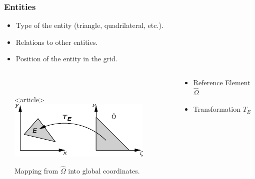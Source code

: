 \documentclass[ignorenonframetext,11pt]{beamer}
\theoremstyle{definition}
\begin{document}
\begin{frame}
  \frametitle{Entities}

  \begin{itemize}
  \item Type of the entity (triangle, quadrilateral, etc.).
  \item Relations to other entities.
  \end{itemize}
  \begin{itemize}
  \item Position of the entity in the grid.
  \end{itemize}

  \pause
  \begin{columns}
    \begin{column}{5mm}
    \end{column}
    \begin{column}{0.4\textwidth}
      \begin{center}
        \\
        \begin{onlyenv}<article>
          \includegraphics[width=0.6\linewidth]{refelem-mapping}\\
        \end{onlyenv}
        \centerline{\tiny Mapping from $\hat{\Omega}$ into global coordinates.}
      \end{center}
    \end{column}
    \begin{column}{0.5\textwidth}
        \begin{itemize}
        \item Reference Element $\hat{\Omega}$
        \item Transformation $T_E$
        \end{itemize}
    \end{column}
  \end{columns}


\end{frame}
\end{document}
